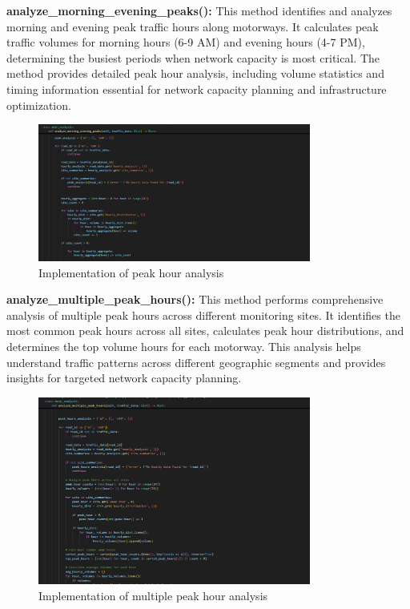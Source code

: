 \documentclass[MScCS]{uccthesis}
\begin{document}
\textbf{analyze\_morning\_evening\_peaks():}
This method identifies and analyzes morning and evening peak traffic hours along motorways. It calculates peak traffic volumes for morning hours (6-9 AM) and evening hours (4-7 PM), determining the busiest periods when network capacity is most critical. The method provides detailed peak hour analysis, including volume statistics and timing information essential for network capacity planning and infrastructure optimization.

\begin{figure}[H]
   \centering
   \includegraphics[width=0.8\textwidth]{Images/analyze_peak_hours.png}
   \caption{Implementation of peak hour analysis}
   \label{fig:temporal_peak_hours}
\end{figure}

\textbf{analyze\_multiple\_peak\_hours():}
This method performs comprehensive analysis of multiple peak hours across different monitoring sites. It identifies the most common peak hours across all sites, calculates peak hour distributions, and determines the top volume hours for each motorway. This analysis helps understand traffic patterns across different geographic segments and provides insights for targeted network capacity planning.

\begin{figure}[H]
   \centering
   \includegraphics[width=0.8\textwidth]{Images/analyze_multiple_peaks.png}
   \caption{Implementation of multiple peak hour analysis}
   \label{fig:temporal_multiple_peaks}
\end{figure}
\end{document}

